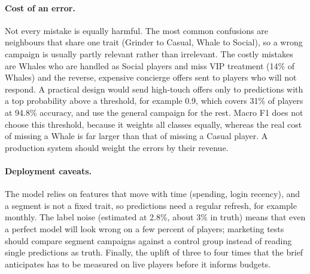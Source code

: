 \documentclass[../main.tex]{subfiles}
\begin{document}
\paragraph{Cost of an error.} Not every mistake is equally harmful. The most common confusions are neighbours that share one trait (Grinder to Casual, Whale to Social), so a wrong campaign is usually partly relevant rather than irrelevant. The costly mistakes are Whales who are handled as Social players and miss VIP treatment (14\% of Whales) and the reverse, expensive concierge offers sent to players who will not respond. A practical design would send high-touch offers only to predictions with a top probability above a threshold, for example 0.9, which covers 31\% of players at 94.8\% accuracy, and use the general campaign for the rest. Macro F1 does not choose this threshold, because it weights all classes equally, whereas the real cost of missing a Whale is far larger than that of missing a Casual player. A production system should weight the errors by their revenue.

\paragraph{Deployment caveats.} The model relies on features that move with time (spending, login recency), and a segment is not a fixed trait, so predictions need a regular refresh, for example monthly. The label noise (estimated at 2.8\%, about 3\% in truth) means that even a perfect model will look wrong on a few percent of players; marketing tests should compare segment campaigns against a control group instead of reading single predictions as truth. Finally, the uplift of three to four times that the brief anticipates has to be measured on live players before it informs budgets.

\endgroup
\end{document}
